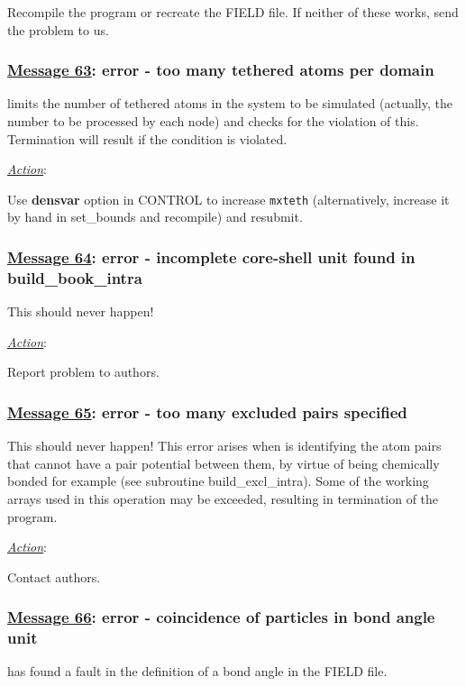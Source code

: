 Recompile the program or recreate the FIELD file.  If neither of
these works, send the problem to us.

\subsubsection*{\underline{Message 63}: error - too many tethered atoms per domain}

\D limits the number of tethered atoms
in the system to be simulated (actually, the number to be processed
by each node) and checks for the violation of this.  Termination will
result if the condition is violated.

\noindent \underline{\em Action}:

Use {\bf densvar} option in CONTROL to increase {\tt mxteth}
(alternatively, increase it by hand in {\sc set\_bounds} and
recompile) and resubmit.

\subsubsection*{\underline{Message 64}: error - incomplete core-shell unit found in build\_book\_intra}

This should never happen!

\noindent \underline{\em Action}:

Report problem to authors.

\subsubsection*{\underline{Message 65}: error - too many excluded pairs specified}

This should never happen!  This error arises when \D is
identifying the atom pairs that cannot have a pair potential
between them,  by virtue of being chemically bonded for example
(see subroutine {\sc build\_excl\_intra}).  Some of the working
arrays used in this operation may be exceeded, resulting in
termination of the program.

\noindent \underline{\em Action}:

Contact authors.

\subsubsection*{\underline{Message 66}: error - coincidence of particles in bond angle unit}

\D has found a fault in the definition of a bond angle in the
FIELD file.

